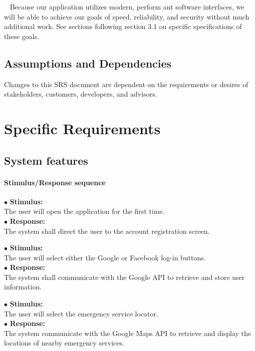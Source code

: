 \documentclass{scrreprt}
\begin{document}
\par ~ Because our application utilizes modern, perform ant software interfaces, we will be able to achieve our goals of speed, reliability, and security without much additional work. See sections following section 3.1 on specific specifications of these goals.


\section{Assumptions and Dependencies}
Changes to this SRS document are dependent on the requirements or desires of stakeholders, customers, developers, and advisors. 


\chapter{Specific Requirements}


\section{System features}


\subsubsection{Stimulus/Response sequence}
\vspace{5mm}
	$\bullet$ \textbf{Stimulus:} \\ \hspace{5mm} The user will open the application for the first time.\\
	$\bullet$ \textbf{Response:} \\ \hspace{5mm} The system shall direct the user to the account registration screen.

\vspace{5mm}
	\hspace{-4.75mm} $\bullet$ \textbf{Stimulus:} \\ \hspace{5mm} The user will select either the Google or Facebook log-in buttons.\\
	$\bullet$ \textbf{Response:} \\ \hspace{5mm} The system shall communicate with the Google API to retrieve and store user information.

\vspace{5mm}
	\hspace{-4.75mm} $\bullet$ \textbf{Stimulus:} \\ \hspace{5mm} The user will select the emergency service locator.\\
	$\bullet$ \textbf{Response:} \\ \hspace{5mm} The system communicate with the Google Maps API to retrieve and display the locations of nearby emergency services.
\end{document}
